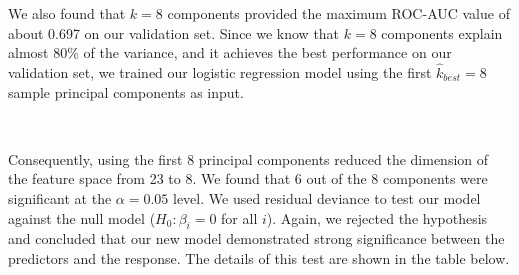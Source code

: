\documentclass[10pt]{article}
\begin{document}
\begin{figure}[hbt!]
\hspace*{\fill}
\centering
{}\hspace{4em}
\hspace*{\fill}
\end{figure}


We also found that $k = 8$ components provided the maximum ROC-AUC value of about 0.697 on our validation set. Since we know that $k=8$ components explain almost 80\% of the variance, and it achieves the best performance on our validation set, we trained our logistic regression model using the first $\hat{k}_{best} = 8$ sample principal components as input. 

\

Consequently, using the first 8 principal components reduced the dimension of the feature space from 23 to 8. We found that 6 out of the 8 components were significant at the $\alpha = 0.05$ level. We used residual deviance to test our model against the null model ($H_0: \beta_i = 0$ for all $i$). Again, we rejected the hypothesis and concluded that our new model demonstrated strong significance between the predictors and the response. The details of this test are shown in the table below.
\end{document}
